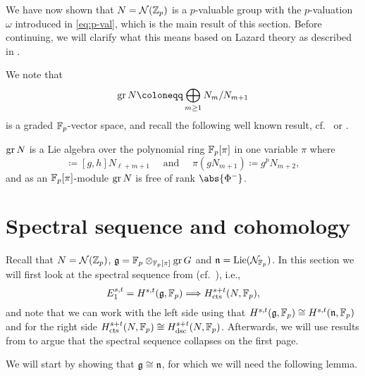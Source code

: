 We have now shown that $N = \mathcal{N}(\mathbb{Z}_{p})$ is a $p$-valuable group with the $p$-valuation $\omega$ introduced in \eqref{eq:p-val}, which is the main result of this section. Before continuing, we will clarify what this means based on Lazard theory as described in .

We note that
\begin{equation*}
  \gr N \coloneqq \bigoplus_{m\geq1} N_{m}/N_{m+1}
\end{equation*}
is a graded $\mathbb{F}_{p}$-vector space, and recall the following well known result, cf.\ \cite{Laz} or \cite[Sect.~25]{Sch}.

\begin{proposition}
  $\operatorname{gr} N$ is a Lie algebra over the polynomial ring $\mathbb{F}_{p}[\pi]$ in one variable $\pi$ where
  \begin{equation*}
    [gN_{\ell+1},hN_{m+1}] \coloneqq [g,h]N_{\ell+m+1} \quad \text{ and } \quad \pi(gN_{m+1}) \coloneqq g^{p}N_{m+2},
  \end{equation*}
  and as an $\mathbb{F}_{p}[\pi]$-module $\operatorname{gr} N$ is free of rank $\abs{\Phi^{-}}$.
\end{proposition}


\section{Spectral sequence and cohomology}\label{sec:specsec}

Recall that $N = \mathcal{N}(\mathbb{Z}_{p})$, $\mathfrak{g} = \mathbb{F}_p \otimes_{\mathbb{F}_p[\pi]} \operatorname{gr} G$ and $\mathfrak{n} = \operatorname{Lie}(\mathcal{N}_{\mathbb{F}_{p}})$. In this section we will first look at the spectral sequence from \cite{Sor} (cf.\ ), i.e.,
\begin{equation*}
  E_{1}^{s,t} = H^{s,t}(\mathfrak{g}, \mathbb{F}_{p}) \Longrightarrow H_{\mathrm{cts}}^{s+t}(N,\mathbb{F}_{p}),
\end{equation*}
and note that we can work with the left side using that $H^{s,t}(\mathfrak{g},\mathbb{F}_{p}) \cong H^{s,t}(\mathfrak{n},\mathbb{F}_{p})$ and for the right side $H_{\mathrm{cts}}^{s+t}(N,\mathbb{F}_{p}) \cong H_{\mathrm{dsc}}^{s+t}(N,\mathbb{F}_{p})$. Afterwards, we will use results from \cite{PT} to argue that the spectral sequence collapses on the first page.

We will start by showing that $\mathfrak{g} \cong \mathfrak{n}$, for which we will need the following lemma.

